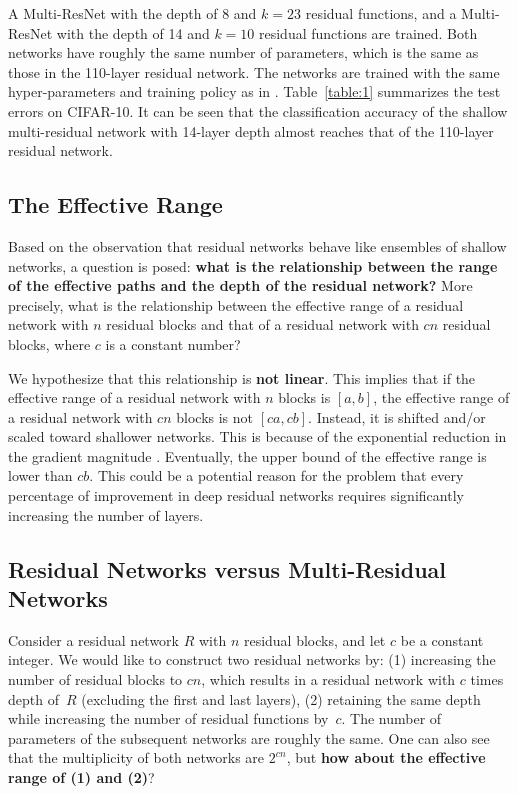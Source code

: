 \documentclass[journal]{IEEEtran}
\begin{document}
A Multi-ResNet with the depth of 8 and $k=23$ residual functions, and a Multi-ResNet with the depth of 14 and $k=10$ residual functions are trained. Both networks have roughly the same number of parameters, which is the same as those in the 110-layer residual network. The networks are trained with the same hyper-parameters and training policy as in \cite{he2015deep}. Table~\ref{table:1} summarizes the test errors on CIFAR-10. It can be seen that the classification accuracy of the shallow multi-residual network with 14-layer depth almost reaches that of the 110-layer residual network.


\subsection{The Effective Range}

Based on the observation that residual networks behave like ensembles of shallow networks, a question is posed: \textbf{what is the relationship between the range of the effective paths and the depth of the residual network?} More precisely, what is the relationship between the effective range of a residual network with $n$ residual blocks and that of a residual network with $cn$ residual blocks, where $c$ is a constant number?

We hypothesize that this relationship is \textbf{not linear}. This implies that if the effective range of a residual network with $n$ blocks is $[a,b]$, the effective range of a residual network with $cn$ blocks is not $[ca,cb]$. Instead, it is shifted and/or scaled toward shallower networks. This is because of the exponential reduction in the gradient magnitude \cite{veit2016residual,bengio1994learning}. Eventually, the upper bound of the effective range is lower than $cb$. This could be a potential reason for the problem that every percentage of improvement in deep residual networks requires significantly increasing the number of layers.  %

\subsection{Residual Networks versus Multi-Residual Networks}\label{vs}

Consider a residual network $R$ with $n$ residual blocks, and let $c$ be a constant integer. We would like to construct two residual networks by: (1) increasing the number of residual blocks to $cn$, which results in a residual network with $c$ times depth of~$R$ (excluding the first and last layers), (2) retaining the same depth while increasing the number of residual functions by~$c$. The number of parameters of the subsequent networks are roughly the same. One can also see that the multiplicity of both networks are $2^{cn}$, but \textbf{how about the effective range of (1) and (2)}?
\end{document}
